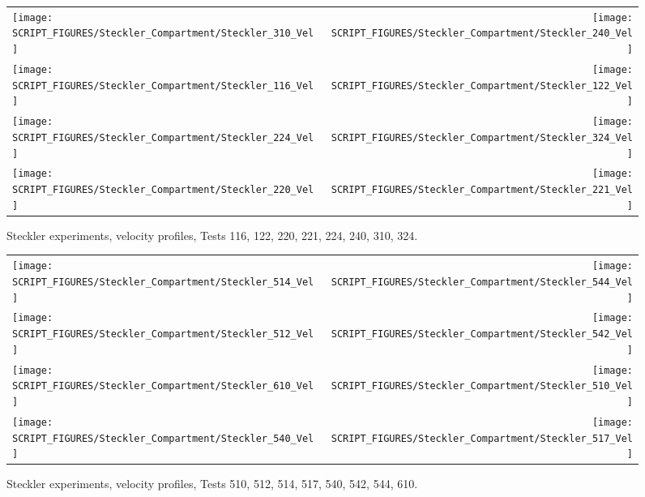 \begin{figure}[p]
\begin{tabular*}{\textwidth}{l@{\extracolsep{\fill}}r}
\texttt{[image: SCRIPT\_FIGURES/Steckler\_Compartment/Steckler\_310\_Vel]} &
\texttt{[image: SCRIPT\_FIGURES/Steckler\_Compartment/Steckler\_240\_Vel]} \\
\texttt{[image: SCRIPT\_FIGURES/Steckler\_Compartment/Steckler\_116\_Vel]} &
\texttt{[image: SCRIPT\_FIGURES/Steckler\_Compartment/Steckler\_122\_Vel]} \\
\texttt{[image: SCRIPT\_FIGURES/Steckler\_Compartment/Steckler\_224\_Vel]} &
\texttt{[image: SCRIPT\_FIGURES/Steckler\_Compartment/Steckler\_324\_Vel]} \\
\texttt{[image: SCRIPT\_FIGURES/Steckler\_Compartment/Steckler\_220\_Vel]} &
\texttt{[image: SCRIPT\_FIGURES/Steckler\_Compartment/Steckler\_221\_Vel]}
\end{tabular*}
\caption[Steckler experiments, velocity profiles, Tests 116, 122, 220, 221, 224, 240, 310, 324]{Steckler experiments, velocity profiles, Tests 116, 122, 220, 221, 224, 240, 310, 324.}
\label{Steckler_Vel_4}
\end{figure}

\begin{figure}[p]
\begin{tabular*}{\textwidth}{l@{\extracolsep{\fill}}r}
\texttt{[image: SCRIPT\_FIGURES/Steckler\_Compartment/Steckler\_514\_Vel]} &
\texttt{[image: SCRIPT\_FIGURES/Steckler\_Compartment/Steckler\_544\_Vel]} \\
\texttt{[image: SCRIPT\_FIGURES/Steckler\_Compartment/Steckler\_512\_Vel]} &
\texttt{[image: SCRIPT\_FIGURES/Steckler\_Compartment/Steckler\_542\_Vel]} \\
\texttt{[image: SCRIPT\_FIGURES/Steckler\_Compartment/Steckler\_610\_Vel]} &
\texttt{[image: SCRIPT\_FIGURES/Steckler\_Compartment/Steckler\_510\_Vel]} \\
\texttt{[image: SCRIPT\_FIGURES/Steckler\_Compartment/Steckler\_540\_Vel]} &
\texttt{[image: SCRIPT\_FIGURES/Steckler\_Compartment/Steckler\_517\_Vel]}
\end{tabular*}
\caption[Steckler experiments, velocity profiles, Tests 510, 512, 514, 517, 540, 542, 544, 610]{Steckler experiments, velocity profiles, Tests 510, 512, 514, 517, 540, 542, 544, 610.}
\label{Steckler_Vel_5}
\end{figure}

